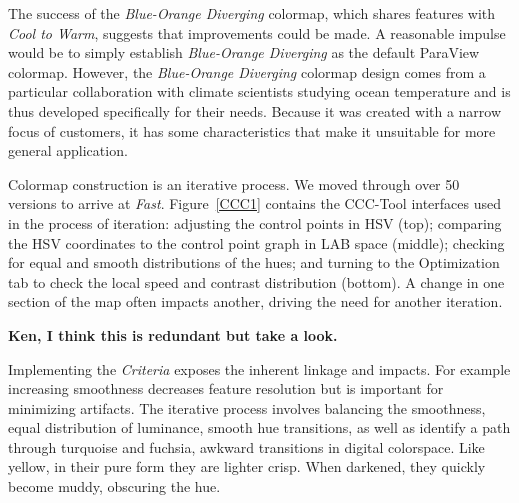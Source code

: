 \documentclass{IEEEcsmag}
\newcommand*{\colormap}[1]{\textsl{#1}\xspace}
\newcommand*{\coolwarm}{\colormap{Cool to Warm}}
\newcommand*{\blueorange}{\colormap{Blue-Orange Diverging}}
\newcommand*{\fast}{\colormap{Fast}}
\begin{document}
The success of the \blueorange colormap, which shares features with \coolwarm, suggests that improvements could be made.
A reasonable impulse would be to simply establish \blueorange as the default ParaView colormap.
However, the \blueorange colormap design comes from a particular collaboration with climate scientists studying ocean temperature and is thus developed specifically for their needs.
Because it was created with a narrow focus of customers, it has some characteristics that make it unsuitable for more general application.


Colormap construction is an iterative process. We moved through over 50 versions to arrive at \fast. Figure~\ref{CCC1} contains the CCC-Tool interfaces used in the process of iteration: adjusting the control points in HSV (top); comparing the HSV coordinates to the control point graph in LAB space (middle); checking for equal and smooth distributions of the hues; and turning to the Optimization tab to check the local speed and contrast distribution (bottom). A change in one section of the map often impacts another, driving the need for another iteration.



\textbf{Ken, I think this is redundant but take a look.}


Implementing the \textit{Criteria} exposes the inherent linkage and impacts. For example increasing smoothness decreases feature resolution but is important for minimizing artifacts. The iterative process involves balancing the smoothness, equal distribution of luminance, smooth hue transitions, as well as identify a path through turquoise and fuchsia, awkward transitions in digital colorspace. Like yellow, in their pure form they are lighter crisp. When darkened, they quickly become muddy, obscuring the hue.
\end{document}
